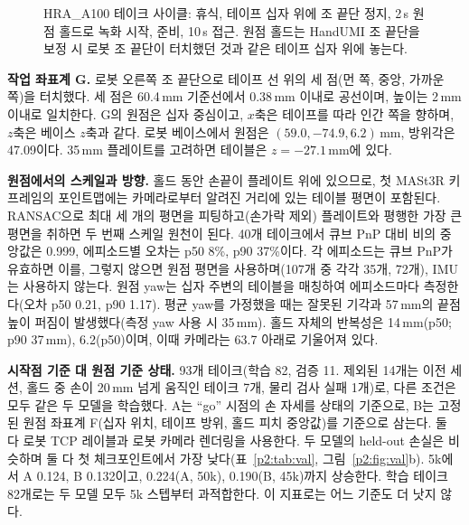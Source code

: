 \documentclass[conference,10pt]{IEEEtran}
\newcommand{\mm}{\,mm\xspace}
\begin{document}
\begin{figure}[t]
\centering
{}
\caption{HRA\_A100 테이크 사이클: 휴식, 테이프 십자 위에 조 끝단 정지, 2\,s 원점 홀드로 녹화 시작, 준비, 10\,s 접근.
원점 홀드는 HandUMI 조 끝단을 보정 시 로봇 조 끝단이 터치했던 것과 같은 테이프 십자 위에 놓는다.}
\label{p2:fig:protocol}
\end{figure}

\textbf{작업 좌표계 G.} 로봇 오른쪽 조 끝단으로 테이프 선 위의 세 점(먼 쪽, 중앙, 가까운 쪽)을 터치했다. 세 점은 60.4\mm
기준선에서 0.38\mm 이내로 공선이며, 높이는 2\mm 이내로 일치한다. G의 원점은 십자 중심이고, $x$축은 테이프를 따라 인간
쪽을 향하며, $z$축은 베이스 $z$축과 같다. 로봇 베이스에서 원점은 $(59.0, -74.9, 6.2)$\mm, 방위각은 47.09\textdegree{}이다.
35\mm 플레이트를 고려하면 테이블은 $z=-27.1$\mm{}에 있다.

\textbf{원점에서의 스케일과 방향.} 홀드 동안 손끝이 플레이트 위에 있으므로, 첫 MASt3R 키프레임의 포인트맵에는 카메라로부터
알려진 거리에 있는 테이블 평면이 포함된다. RANSAC으로 최대 세 개의 평면을 피팅하고(손가락 제외) 플레이트와 평행한 가장
큰 평면을 취하면 두 번째 스케일 원천이 된다. 40개 테이크에서 큐브 PnP 대비 비의 중앙값은 0.999, 에피소드별 오차는 p50 8\%,
p90 37\%이다. 각 에피소드는 큐브 PnP가 유효하면 이를, 그렇지 않으면 원점 평면을 사용하며(107개 중 각각 35개, 72개),
IMU는 사용하지 않는다. 원점 yaw는 십자 주변의 테이블을 매칭하여 에피소드마다 측정한다(오차 p50 0.21\textdegree, p90
1.17\textdegree). 평균 yaw를 가정했을 때는 잘못된 기각과 57\mm{}의 끝점 높이 퍼짐이 발생했다(측정 yaw 사용 시 35\mm).
홀드 자체의 반복성은 14\mm(p50; p90 37\mm), 6.2\textdegree(p50)이며, 이때 카메라는 63.7\textdegree{} 아래로 기울어져 있다.

\textbf{시작점 기준 대 원점 기준 상태.} 93개 테이크(학습 82, 검증 11. 제외된 14개는 이전 세션, 홀드 중 손이 20\mm 넘게
움직인 테이크 7개, 물리 검사 실패 1개)로, 다른 조건은 모두 같은 두 모델을 학습했다. A는 ``go'' 시점의 손 자세를 상태의
기준으로, B는 고정된 원점 좌표계 F(십자 위치, 테이프 방위, 홀드 피치 중앙값)를 기준으로 삼는다. 둘 다 로봇 TCP 레이블과
로봇 카메라 렌더링을 사용한다. 두 모델의 held-out 손실은 비슷하며 둘 다 첫 체크포인트에서 가장 낮다(표~\ref{p2:tab:val},
그림~\ref{p2:fig:val}b). 5k에서 A 0.124, B 0.132이고, 0.224(A, 50k), 0.190(B, 45k)까지 상승한다. 학습 테이크 82개로는 두
모델 모두 5k 스텝부터 과적합한다. 이 지표로는 어느 기준도 더 낫지 않다.
\end{document}

